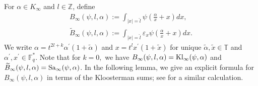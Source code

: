 \documentclass[10pt]{amsart}
\theoremstyle{plain}
\theoremstyle{plain}
\theoremstyle{remark}
\theoremstyle{definition}
\newcommand{\Ki}{K_\infty}
\newcommand{\hl}{\widehat l}
\newcommand{\Kl}{\textup{Kl}}
\newcommand{\Sa}{\textup{Sa}}
\newcommand{\FF}{\mathbb{F}}
\newcommand{\TT}{\mathbb{T}}
\begin{document}
For $\alpha\in \Ki$ and $l\in \mathbb{Z}$,  define
\begin{equation}\label{Binf}
\begin{split}
B_{\infty}(\psi,l,\alpha):=\int_{|x|=\hl} \psi(\frac{\alpha}{ x}+x) dx,
\\
\widetilde{B}_{\infty}(\psi,l,\alpha):=\int_{|x|=\hl} \varepsilon_{x} \psi(\frac{\alpha}{ x}+x) dx.
\end{split}
\end{equation}
   We write  $\alpha= t^{2l+k}\alpha^{\prime} (1+\tilde{\alpha})$ and  $x=t^lx^{\prime}(1+\tilde{x})$ for unique $\tilde{\alpha},\tilde{x}\in \TT $ and $\alpha^{\prime}, x^{\prime} \in \FF_q^*.$  Note that for $k=0,$ we have   $B_{\infty}(\psi,l,\alpha)=\Kl_{\infty}(\psi,\alpha)$ and $\widetilde{B}_{\infty}(\psi,l,\alpha)=\Sa_{\infty}(\psi,\alpha)$.
In the following lemma, we give an explicit formula for  $B_{\infty}(\psi,l,\alpha)$ in terms of the Kloosterman sums; see  \cite[Lemma 3.4]{CPS} for a similar calculation.  
\end{document}
